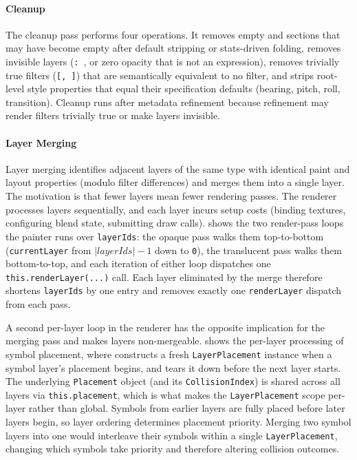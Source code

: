 \paragraph{Cleanup}
The cleanup pass performs four operations.
It removes empty  and  sections that may have become empty after default stripping or stats-driven folding, removes invisible layers (\texttt{:~}, or zero opacity that is not an expression), removes trivially true filters (\texttt{[,~]}) that are semantically equivalent to no filter, and strips root-level style properties that equal their specification defaults (bearing, pitch, roll, transition).
Cleanup runs after metadata refinement because refinement may render filters trivially true or make layers invisible.

\paragraph{Layer Merging}
Layer merging identifies adjacent layers of the same type with identical paint and layout properties (modulo filter differences) and merges them into a single layer.
The motivation is that fewer layers mean fewer rendering passes.
The renderer processes layers sequentially, and each layer incurs setup costs (binding textures, configuring blend state, submitting draw calls).
 shows the two render-pass loops the painter runs over \texttt{layerIds}: the opaque pass walks them top-to-bottom (\texttt{currentLayer} from $|layerIds| - 1$ down to \texttt{0}), the translucent pass walks them bottom-to-top, and each iteration of either loop dispatches one \texttt{this.renderLayer(...)} call.
Each layer eliminated by the merge therefore shortens \texttt{layerIds} by one entry and removes exactly one \texttt{renderLayer} dispatch from each pass.

A second per-layer loop in the renderer has the opposite implication for the merging pass and makes  layers non-mergeable.  shows the per-layer processing of symbol placement, where  constructs a fresh \texttt{LayerPlacement} instance when a symbol layer's placement begins, and  tears it down before the next layer starts.
The underlying \texttt{Placement} object (and its \texttt{CollisionIndex}) is shared across all layers via \texttt{this.placement}, which is what makes the \texttt{LayerPlacement} scope per-layer rather than global.
Symbols from earlier layers are fully placed before later layers begin, so layer ordering determines placement priority.
Merging two symbol layers into one would interleave their symbols within a single \texttt{LayerPlacement}, changing which symbols take priority and therefore altering collision outcomes.

